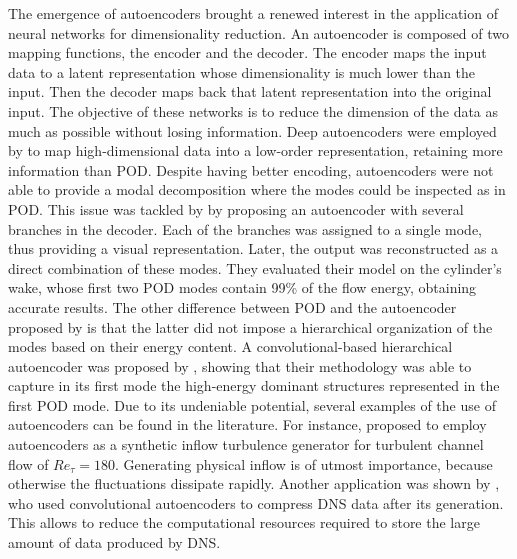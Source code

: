 The emergence of autoencoders \citep{demers1993non} brought a renewed interest in the application of neural networks for dimensionality reduction.
An autoencoder is composed of two mapping functions, the encoder and the decoder.
The encoder maps the input data to a latent representation whose dimensionality is much lower than the input.
Then the decoder maps back that latent representation into the original input.
The objective of these networks is to reduce the dimension of the data as much as possible without losing information.
Deep autoencoders were employed by \citet{hinton2006reducing} to map high-dimensional data into a low-order representation, retaining more information than POD.
Despite having better encoding, autoencoders were not able to provide a modal decomposition where the modes could be inspected as in POD.
This issue was tackled by \cite{murata2020nonlinear} by proposing an autoencoder with several branches in the decoder.
Each of the branches was assigned to a single mode, thus providing a visual representation.
Later, the output was reconstructed as a direct combination of these modes.
They evaluated their model on the cylinder's wake, whose first two POD modes contain 99\% of the flow energy, obtaining accurate results.
The other difference between POD and the autoencoder proposed by \citet{murata2020nonlinear} is that the latter did not impose a hierarchical organization of the modes based on their energy content.
A convolutional-based hierarchical autoencoder was proposed by \citet{fukami2020convolutional}, showing that their methodology was able to capture in its first mode the high-energy dominant structures represented in the first POD mode.
Due to its undeniable potential, several examples of the use of autoencoders can be found in the literature.
For instance, \citet{fukami2019synthetic} proposed to employ autoencoders as a synthetic inflow turbulence generator for turbulent channel flow of $Re_{\tau}=180$.
Generating physical inflow is of utmost importance, because otherwise the fluctuations dissipate rapidly.
Another application was shown by \citet{glaws2020deep}, who used convolutional autoencoders to compress DNS data after its generation.
This allows to reduce the computational resources required to store the large amount of data produced by DNS.


